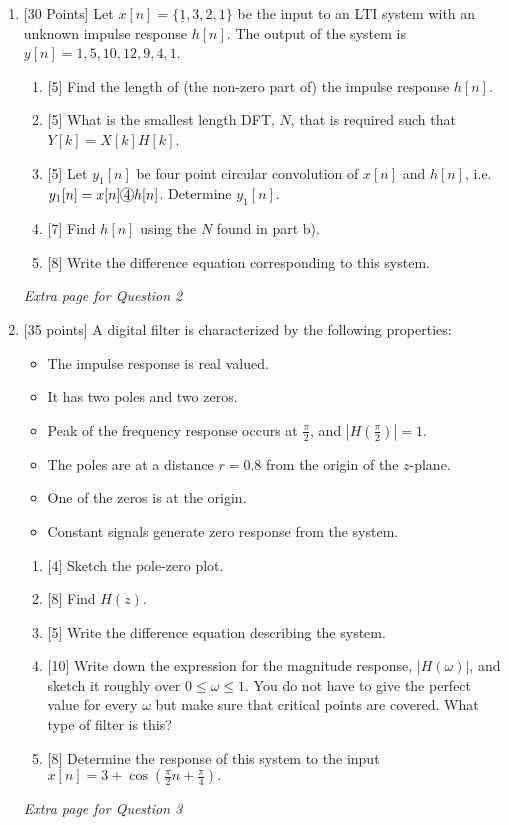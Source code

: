 \documentclass{article}
\newcommand*\encircle[1]{%
\tikz[baseline=(C.base)]\node[draw,circle,inner sep=0.5pt](C) {#1};
}
\begin{document}
\begin{enumerate}
    \vspace{1in}
    \item {[30 Points]} Let $x[n]=\{\underline{1},3,2,1\}$ be the input to an LTI system with an unknown impulse response $h[n]$. The output of the system is $y[n] = {1,5,10,12,9,4,1}$.
    \begin{enumerate}
        \item {[5]} Find the length of (the non-zero part of) the impulse response $h[n]$.
        \item {[5]} What is the smallest length DFT, $N$, that is required such that $Y[k] = X[k]H[k]$.
        \item {[5]} Let $y_1[n]$ be four point circular convolution of $x[n]$ and $h[n]$, i.e. $y_1[n] = x[n] \encircle{4} h[n] $. Determine $y_1[n]$.
        \item {[7]} Find $h[n]$ using the $N$ found in part b). 
        \item {[8]} Write the difference equation corresponding to this system.
    \end{enumerate}
    \newpage
    \textit{Extra page for Question 2}
    \newpage
    \item {[35 points]} A digital filter is characterized by the following properties:
    \begin{itemize}
        \item The impulse response is real valued.
        \item It has two poles and two zeros.
        \item Peak of the frequency response occurs at $\frac{\pi}{2}$, and $\left|H\left(\frac{\pi}{2}\right)\right| = 1$.
        \item The poles are at a distance $r=0.8$ from the origin of the $z$-plane.
        \item One of the zeros is at the origin.
        \item Constant signals generate zero response from the system.
    \end{itemize}
    \begin{enumerate}
        \item {[4]} Sketch the pole-zero plot.
        \item {[8]} Find $H(z)$.
        \item {[5]} Write the difference equation describing the system.
        \item {[10]} Write down the expression for the magnitude response, $|H(\omega)|$, and sketch it roughly over $0\leq \omega \leq 1$. You do not have to give the perfect value for every $\omega$ but make sure that critical points are covered. What type of filter is this?
        \item {[8]} Determine the response of this system to the input $x[n]=3+\cos\left(\frac{\pi}{2}n+\frac{\pi}{4}\right).$
    \end{enumerate}
    
    \newpage
    \textit{Extra page for Question 3}
\end{enumerate}
\end{document}

